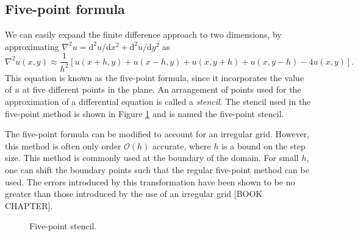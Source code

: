 \documentclass[a4paper]{article}
\newcommand{\dd}{\mathrm{d}}
\begin{document}
\subsection{Five-point formula}

We can easily expand the finite difference approach to two dimensions,
by approximating $\nabla^2 u = \dd^2 u / \dd x^2 + \dd^2 u / \dd y^2$
as
\begin{equation}
  \nabla^2 u(x, y) \approx \frac{1}{h^2} \left[
      u(x + h, y) + u(x - h, y) + u(x, y + h)
      + u(x, y - h) - 4 u(x, y) \right].
\end{equation}
This equation is known as the five-point formula, since it
incorporates the value of $u$ at five different points in the plane.
An arrangement of points used for the approximation of a differential
equation is called a \emph{stencil}. The stencil used in the
five-point method is shown in Figure \ref{fig:5pt} and is named the
five-point stencil.

The five-point formula can be modified to account for an irregular
grid. However, this method is often only order $\mathcal{O}(h)$
accurate, where $h$ is a bound on the step size. This method is
commonly used at the boundary of the domain. For small $h$, one can
shift the boundary points such that the regular five-point method can
be used. The errors introduced by this transformation have been shown
to be no greater than those introduced by the use of an irregular
grid \cite{}[BOOK CHAPTER].

\begin{figure}
  \begin{center}
  \end{center}
  \caption{Five-point stencil.} \label{fig:5pt}
\end{figure}
\end{document}
